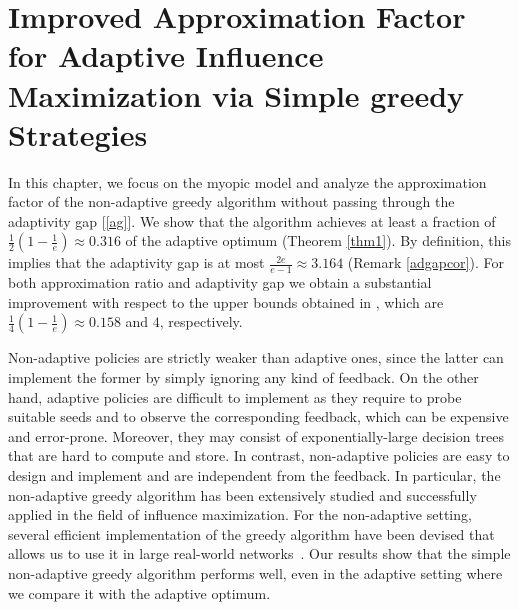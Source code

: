 

\chapter{Improved Approximation Factor for Adaptive Influence Maximization via Simple greedy Strategies}\label{chap:sota}

In this chapter, we focus on the myopic model and analyze the approximation factor of the non-adaptive greedy algorithm without passing through the adaptivity gap [\ref{ag}]. We show that the algorithm achieves at least a fraction of $\frac{1}{2}\left(1-\frac{1}{e}\right)\approx 0.316$ of the adaptive optimum (Theorem \ref{thm1}). By definition, this implies that the adaptivity gap is at most $\frac{2e}{e-1}\approx 3.164$ (Remark \ref{adgapcor}). For both approximation ratio and adaptivity gap we obtain a substantial improvement with respect to the upper bounds obtained in \cite{Peng2019}, which are $\frac{1}{4}\left(1-\frac{1}{e}\right)\approx 0.158$ and $4$, respectively. 

Non-adaptive policies are strictly weaker than adaptive ones, since the latter can implement the former by simply ignoring any kind of feedback. On the other hand, adaptive policies are difficult to implement as they require to probe suitable seeds and to observe the corresponding feedback, which can be expensive and error-prone. Moreover, they may consist of exponentially-large decision trees that are hard to compute and store. In contrast, non-adaptive policies are easy to design and implement and are independent from the feedback. In particular, the non-adaptive greedy algorithm has been extensively studied and successfully applied in the field of influence maximization. For the non-adaptive setting, several efficient implementation of the greedy algorithm have been devised that allows us to use it in large real-world networks~\cite{Cohen14,Goyal11,Leskovec2007,Nguyen16,Tang15,Tang2014}. Our results show that the simple non-adaptive greedy algorithm performs well, even in the adaptive setting where we compare it with the adaptive optimum.


